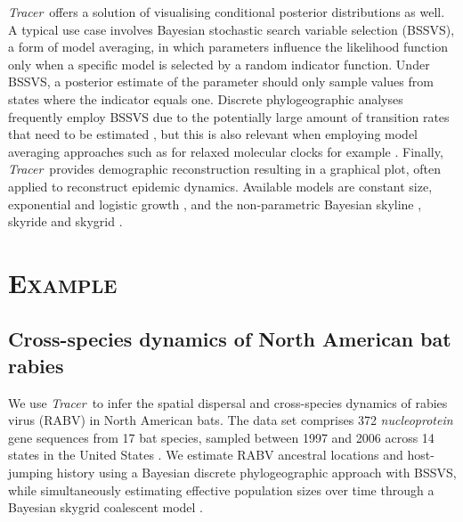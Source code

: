\documentclass[webpdf,mynatbib,nosurname,nogrid,noCE,noMSC]{SYS}
\newcommand{\tracer}{\emph{Tracer}}
\begin{document}
\tracer\ offers a solution of visualising conditional posterior distributions as well.
A typical use case involves Bayesian stochastic search variable selection (BSSVS), a form of model averaging, in which parameters influence the likelihood function only when a specific model is selected by a random indicator function.
Under BSSVS, a posterior estimate of the parameter should only sample values from states where the indicator equals one.
Discrete phylogeographic analyses frequently employ BSSVS due to the potentially large amount of transition rates that need to be estimated \citep{Lemey2009}, but this is also relevant when employing model averaging approaches such as for relaxed molecular clocks for example \citep{Li2012}.
%
Finally, \tracer\ provides demographic reconstruction resulting in a graphical plot, often applied to reconstruct epidemic dynamics.
Available models are constant size, exponential and logistic growth \citep{drummond2002estimating},
and the non-parametric Bayesian skyline \citep{drummond2005bayesian,heledDrummond2008}, skyride \citep{minin2008smooth} and skygrid \citep{gill2012improving}.

\vspace{-0.7cm}

\section*{\textsc{Example}}

\subsection*{Cross-species dynamics of North American bat rabies}

We use \tracer\ to infer the spatial dispersal and cross-species dynamics of rabies virus (RABV) in North American bats.
The data set comprises 372 \textit{nucleoprotein} gene sequences from 17 bat species, sampled between 1997 and 2006 across 14 states in the United States \citep{Streicker,Faria2013}.
We estimate RABV ancestral locations and host-jumping history using a Bayesian discrete phylogeographic approach with BSSVS, while simultaneously estimating effective population sizes over time through a Bayesian skygrid coalescent model \citep{gill2012improving}.
\end{document}
